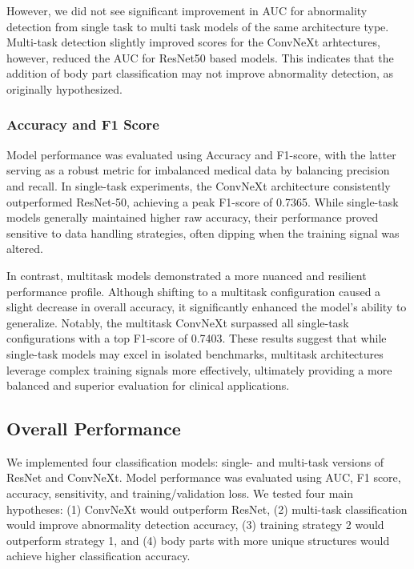 \documentclass[conference]{IEEEtran}
\begin{document}
However, we did not see significant improvement in AUC for abnormality detection from single task to multi task models of the same architecture type. Multi-task detection slightly improved scores for the ConvNeXt arhtectures, however, reduced the AUC for ResNet50 based models. This indicates that the addition of body part classification may not improve abnormality detection, as originally hypothesized. 

\subsubsection{Accuracy and F1 Score}
Model performance was evaluated using Accuracy and F1-score, with the latter serving as a robust metric for imbalanced medical data by balancing precision and recall. In single-task experiments, the ConvNeXt architecture consistently outperformed ResNet-50, achieving a peak F1-score of 0.7365. While single-task models generally maintained higher raw accuracy, their performance proved sensitive to data handling strategies, often dipping when the training signal was altered.

In contrast, multitask models demonstrated a more nuanced and resilient performance profile. Although shifting to a multitask configuration caused a slight decrease in overall accuracy, it significantly enhanced the model's ability to generalize. Notably, the multitask ConvNeXt surpassed all single-task configurations with a top F1-score of 0.7403. These results suggest that while single-task models may excel in isolated benchmarks, multitask architectures leverage complex training signals more effectively, ultimately providing a more balanced and superior evaluation for clinical applications.

\subsection{\textbf{Overall Performance}}
We implemented four classification models: single- and multi-task versions of ResNet and ConvNeXt. Model performance was evaluated using AUC, F1 score, accuracy, sensitivity, and training/validation loss. We tested four main hypotheses: (1) ConvNeXt would outperform ResNet, (2) multi-task classification would improve abnormality detection accuracy, (3) training strategy 2 would outperform strategy 1, and (4) body parts with more unique structures would achieve higher classification accuracy.
\end{document}
